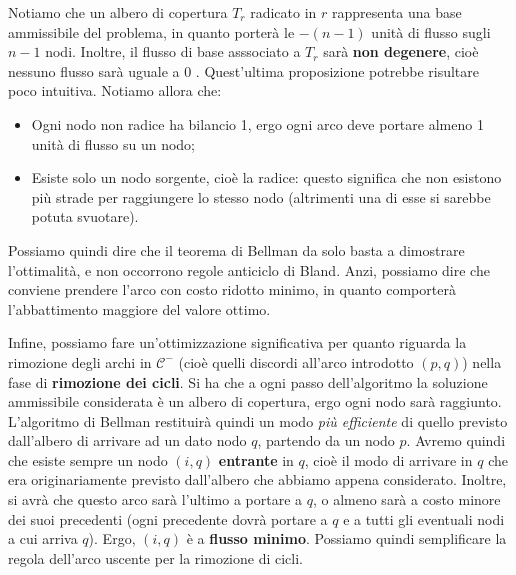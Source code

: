 \documentclass[a4paper,11pt]{article}
\begin{document}
Notiamo che un albero di copertura $T_r$ radicato in $r$ rappresenta una base ammissibile del problema, in quanto porterà le $-(n-1)$ unità di flusso sugli $n-1$ nodi.
Inoltre, il flusso di base asssociato a $T_r$ sarà \textbf{non degenere}, cioè nessuno flusso sarà uguale a 0 .
Quest'ultima proposizione potrebbe risultare poco intuitiva.
Notiamo allora che:
\begin{itemize}
	\item Ogni nodo non radice ha bilancio 1, ergo ogni arco deve portare almeno 1 unità di flusso su un nodo;
	\item Esiste solo un nodo sorgente, cioè la radice: questo significa che non esistono più strade per raggiungere lo stesso nodo (altrimenti una di esse si sarebbe potuta svuotare).
\end{itemize}
Possiamo quindi dire che il teorema di Bellman da solo basta a dimostrare l'ottimalità, e non occorrono regole anticiclo di Bland.
Anzi, possiamo dire che conviene prendere l'arco con costo ridotto minimo, in quanto comporterà l'abbattimento maggiore del valore ottimo.

Infine, possiamo fare un'ottimizzazione significativa per quanto riguarda la rimozione degli archi in $\mathcal{C}^-$ (cioè quelli discordi all'arco introdotto $(p,q)$) nella fase di \textbf{rimozione dei cicli}.
Si ha che a ogni passo dell'algoritmo la soluzione ammissibile considerata è un albero di copertura, ergo ogni nodo sarà raggiunto.
L'algoritmo di Bellman restituirà quindi un modo \textit{più efficiente} di quello previsto dall'albero di arrivare ad un dato nodo $q$, partendo da un nodo $p$.
Avremo quindi che esiste sempre un nodo $(i,q)$ \textbf{entrante} in $q$, cioè il modo di arrivare in $q$ che era originariamente previsto dall'albero che abbiamo appena considerato.
Inoltre, si avrà che questo arco sarà l'ultimo a portare a $q$, o almeno sarà a costo minore dei suoi precedenti (ogni precedente dovrà portare a $q$ e a tutti gli eventuali nodi a cui arriva $q$).
Ergo, $(i, q)$ è a \textbf{flusso minimo}.
Possiamo quindi semplificare la regola dell'arco uscente per la rimozione di cicli.
\end{document}
